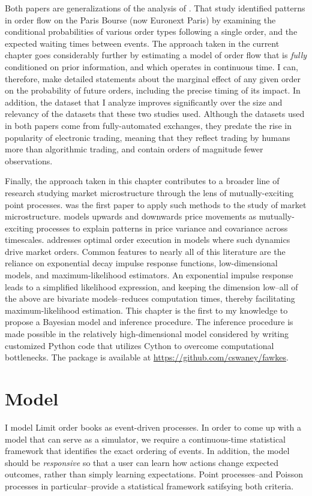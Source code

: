 	Both papers are generalizations of the analysis of \cite{Biais1995}. That study identified patterns in order flow on the Paris Bourse (now Euronext Paris) by examining the conditional probabilities of various order types following a single order, and the expected waiting times between events. The approach taken in the current chapter goes considerably further by estimating a model of order flow that is \textit{fully} conditioned on prior information, and which operates in continuous time. I can, therefore, make detailed statements about the marginal effect of any given order on the probability of future orders, including the precise timing of its impact. In addition, the dataset that I analyze improves significantly over the size and relevancy of the datasets that these two studies used. Although the datasets used in both papers come from fully-automated exchanges, they predate the rise in popularity of electronic trading, meaning that they reflect trading by humans more than algorithmic trading, and contain orders of magnitude fewer observations.

	Finally, the approach taken in this chapter contributes to a broader line of research studying market microstructure through the lens of mutually-exciting point processes. \cite{Bowsher2007} was the first paper to apply such methods to the study of market microstructure. \cite{Bacry2013} models upwards and downwards price movements as mutually-exciting processes to explain patterns in price variance and covariance across timescales. \cite{Alfonsi2016} addresses optimal order execution in models where such dynamics drive market orders. Common features to nearly all of this literature are the reliance on exponential decay impulse response functions, low-dimensional models, and maximum-likelihood estimators. An exponential impulse response leads to a simplified likelihood expression, and keeping the dimension low--all of the above are bivariate models--reduces computation times, thereby facilitating maximum-likelihood estimation. This chapter is the first to my knowledge to propose a Bayesian model and inference procedure. The inference procedure is made possible in the relatively high-dimensional model considered by writing customized Python code that utilizes Cython to overcome computational bottlenecks. The package is available at \url{https://github.com/cswaney/fawkes}.


\section{Model}
	I model Limit order books as event-driven processes. In order to come up with a model that can serve as a simulator, we require a continuous-time statistical framework that identifies the exact ordering of events. In addition, the model should be \textit{responsive} so that a user can learn how actions change expected outcomes, rather than simply learning expectations. Point processes--and Poisson processes in particular--provide a statistical framework satifsying both criteria.

